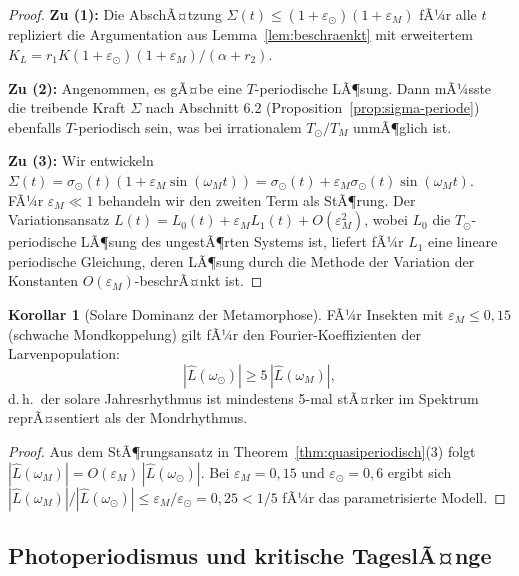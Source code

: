 ﻿\documentclass[12pt, a4paper]{article}
\theoremstyle{definition}
\newtheorem{korollar}[theorem]{Korollar}
\begin{document}
\begin{proof}
\textbf{Zu (1):} Die AbschÃ¤tzung $\Sigma(t) \leq (1+\varepsilon_{\odot})(1+\varepsilon_M)$
fÃ¼r alle $t$ repliziert die Argumentation aus Lemma~\ref{lem:beschraenkt} mit
erweitertem $K_L = r_1 K (1+\varepsilon_{\odot})(1+\varepsilon_M)/(\alpha+r_2)$.

\textbf{Zu (2):} Angenommen, es gÃ¤be eine $T$-periodische LÃ¶sung. Dann mÃ¼sste
die treibende Kraft $\Sigma$ nach Abschnitt 6.2 (Proposition~\ref{prop:sigma-periode})
ebenfalls $T$-periodisch sein, was bei irrationalem $T_{\odot}/T_M$ unmÃ¶glich ist.

\textbf{Zu (3):} Wir entwickeln $\Sigma(t) = \sigma_{\odot}(t)(1 + \varepsilon_M\sin(\omega_M t))
= \sigma_{\odot}(t) + \varepsilon_M\sigma_{\odot}(t)\sin(\omega_M t)$.
FÃ¼r $\varepsilon_M \ll 1$ behandeln wir den zweiten Term als StÃ¶rung.
Der Variationsansatz $L(t) = L_0(t) + \varepsilon_M L_1(t) + O(\varepsilon_M^2)$,
wobei $L_0$ die $T_{\odot}$-periodische LÃ¶sung des ungestÃ¶rten Systems ist,
liefert fÃ¼r $L_1$ eine lineare periodische Gleichung, deren LÃ¶sung
durch die Methode der Variation der Konstanten $O(\varepsilon_M)$-beschrÃ¤nkt ist. \hfill
\end{proof}

\begin{korollar}[Solare Dominanz der Metamorphose]\label{cor:solare-dominanz}
FÃ¼r Insekten mit $\varepsilon_M \leq 0{,}15$ (schwache Mondkoppelung) gilt fÃ¼r
den Fourier-Koeffizienten der Larvenpopulation:
\[
  |\hat{L}(\omega_{\odot})| \geq 5\,|\hat{L}(\omega_M)|,
\]
d.\,h.\ der solare Jahresrhythmus ist mindestens 5-mal stÃ¤rker im Spektrum
reprÃ¤sentiert als der Mondrhythmus.
\end{korollar}

\begin{proof}
Aus dem StÃ¶rungsansatz in Theorem~\ref{thm:quasiperiodisch}(3) folgt
$|\hat{L}(\omega_M)| = O(\varepsilon_M)\,|\hat{L}(\omega_{\odot})|$.
Bei $\varepsilon_M = 0{,}15$ und $\varepsilon_{\odot} = 0{,}6$ ergibt sich
$|\hat{L}(\omega_M)|/|\hat{L}(\omega_{\odot})| \leq \varepsilon_M/\varepsilon_{\odot}
= 0{,}25 < 1/5$ fÃ¼r das parametrisierte Modell. \hfill
\end{proof}

\subsection{Photoperiodismus und kritische TageslÃ¤nge}
\end{document}

